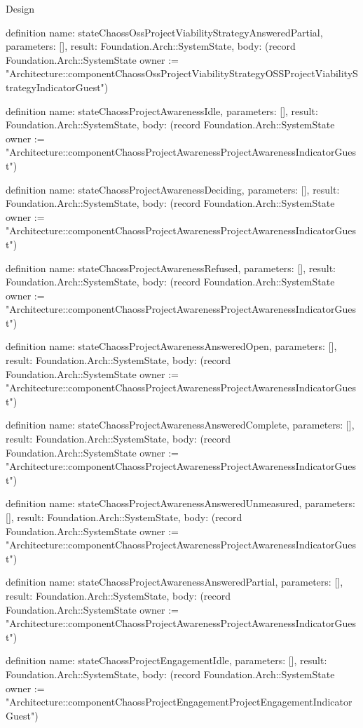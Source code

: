 \begin{lexlean}{Design}
\begin{semanticmodule}
definition{
  name: stateChaossOssProjectViabilityStrategyAnsweredPartial,
  parameters: [],
  result: Foundation.Arch::SystemState,
  body: (record Foundation.Arch::SystemState {owner := "Architecture::componentChaossOssProjectViabilityStrategyOSSProjectViabilityStrategyIndicatorGuest"})
}

definition{
  name: stateChaossProjectAwarenessIdle,
  parameters: [],
  result: Foundation.Arch::SystemState,
  body: (record Foundation.Arch::SystemState {owner := "Architecture::componentChaossProjectAwarenessProjectAwarenessIndicatorGuest"})
}

definition{
  name: stateChaossProjectAwarenessDeciding,
  parameters: [],
  result: Foundation.Arch::SystemState,
  body: (record Foundation.Arch::SystemState {owner := "Architecture::componentChaossProjectAwarenessProjectAwarenessIndicatorGuest"})
}

definition{
  name: stateChaossProjectAwarenessRefused,
  parameters: [],
  result: Foundation.Arch::SystemState,
  body: (record Foundation.Arch::SystemState {owner := "Architecture::componentChaossProjectAwarenessProjectAwarenessIndicatorGuest"})
}

definition{
  name: stateChaossProjectAwarenessAnsweredOpen,
  parameters: [],
  result: Foundation.Arch::SystemState,
  body: (record Foundation.Arch::SystemState {owner := "Architecture::componentChaossProjectAwarenessProjectAwarenessIndicatorGuest"})
}

definition{
  name: stateChaossProjectAwarenessAnsweredComplete,
  parameters: [],
  result: Foundation.Arch::SystemState,
  body: (record Foundation.Arch::SystemState {owner := "Architecture::componentChaossProjectAwarenessProjectAwarenessIndicatorGuest"})
}

definition{
  name: stateChaossProjectAwarenessAnsweredUnmeasured,
  parameters: [],
  result: Foundation.Arch::SystemState,
  body: (record Foundation.Arch::SystemState {owner := "Architecture::componentChaossProjectAwarenessProjectAwarenessIndicatorGuest"})
}

definition{
  name: stateChaossProjectAwarenessAnsweredPartial,
  parameters: [],
  result: Foundation.Arch::SystemState,
  body: (record Foundation.Arch::SystemState {owner := "Architecture::componentChaossProjectAwarenessProjectAwarenessIndicatorGuest"})
}

definition{
  name: stateChaossProjectEngagementIdle,
  parameters: [],
  result: Foundation.Arch::SystemState,
  body: (record Foundation.Arch::SystemState {owner := "Architecture::componentChaossProjectEngagementProjectEngagementIndicatorGuest"})
}


\end{semanticmodule}
\end{lexlean}
